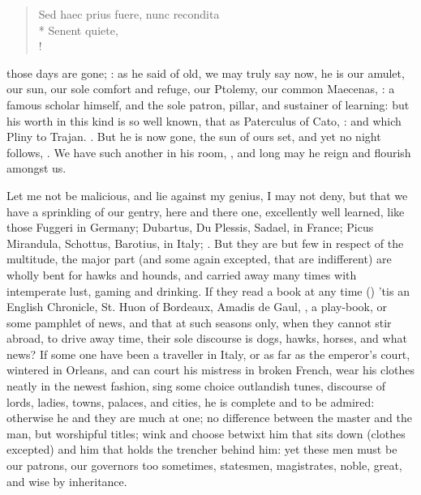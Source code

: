 \begin{latin}
\begin{verse}%
Sed haec prius fuere, nunc recondita\\*
Senent quiete,\\!
\end{verse}%
\end{latin}

those days are gone; : as he said of old, we may truly say now, he is
our amulet, our sun, our sole comfort and refuge, our
Ptolemy, our common Maecenas, : a famous scholar
himself, and the sole patron, pillar, and sustainer of learning: but his worth
in this kind is so well known, that as Paterculus of Cato, : and which Pliny to Trajan. . But he is now gone, the sun of ours set, and yet no night follows,
. We have such another in his room,
, and long may he reign and flourish amongst us.

Let me not be malicious, and lie against my genius, I may not deny, but that we
have a sprinkling of our gentry, here and there one, excellently well learned,
like those Fuggeri in Germany; Dubartus, Du Plessis, Sadael, in France; Picus
Mirandula, Schottus, Barotius, in Italy; . But they are but few in respect of the multitude, the major part (and
some again excepted, that are indifferent) are wholly bent for hawks and
hounds, and carried away many times with intemperate lust, gaming and drinking.
If they read a book at any time () 'tis an English Chronicle, St. Huon of Bordeaux,
Amadis de Gaul, \etc{}, a play-book, or some pamphlet of news, and that at such
seasons only, when they cannot stir abroad, to drive away time,
their sole discourse is dogs, hawks, horses, and what
news? If some one have been a traveller in Italy, or as far as the emperor's
court, wintered in Orleans, and can court his mistress in broken French, wear
his clothes neatly in the newest fashion, sing some choice outlandish tunes,
discourse of lords, ladies, towns, palaces, and cities, he is complete and to
be admired: otherwise he and they are much at one; no
difference between the master and the man, but worshipful titles; wink and
choose betwixt him that sits down (clothes excepted) and him that holds the
trencher behind him: yet these men must be our patrons, our governors too
sometimes, statesmen, magistrates, noble, great, and wise by inheritance.

